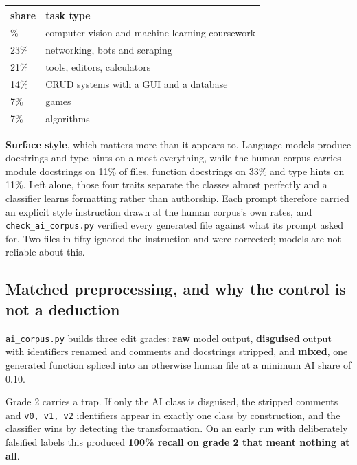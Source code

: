 \begin{longtable}[]{@{}ll@{}}
\toprule\noalign{}
share & task type \\
\midrule\noalign{}
\endhead
\bottomrule\noalign{}
\endlastfoot
28\% & computer vision and machine-learning coursework \\
23\% & networking, bots and scraping \\
21\% & tools, editors, calculators \\
14\% & CRUD systems with a GUI and a database \\
7\% & games \\
7\% & algorithms \\
\end{longtable}

\textbf{Surface style}, which matters more than it appears to. Language
models produce docstrings and type hints on almost everything, while the
human corpus carries module docstrings on 11\% of files, function
docstrings on 33\% and type hints on 11\%. Left alone, those four traits
separate the classes almost perfectly and a classifier learns formatting
rather than authorship. Each prompt therefore carried an explicit style
instruction drawn at the human corpus's own rates, and
\texttt{check\_ai\_corpus.py} verified every generated file against what
its prompt asked for. Two files in fifty ignored the instruction and
were corrected; models are not reliable about this.

\hypertarget{matched-preprocessing-and-why-the-control-is-not-a-deduction}{%
\subsection{Matched preprocessing, and why the control is not a
deduction}\label{matched-preprocessing-and-why-the-control-is-not-a-deduction}}

\texttt{ai\_corpus.py} builds three edit grades: \textbf{raw} model
output, \textbf{disguised} output with identifiers renamed and comments
and docstrings stripped, and \textbf{mixed}, one generated function
spliced into an otherwise human file at a minimum AI share of 0.10.

Grade 2 carries a trap. If only the AI class is disguised, the stripped
comments and \texttt{v0,\ v1,\ v2} identifiers appear in exactly one
class by construction, and the classifier wins by detecting the
transformation. On an early run with deliberately falsified labels this
produced \textbf{100\% recall on grade 2 that meant nothing at all}.

